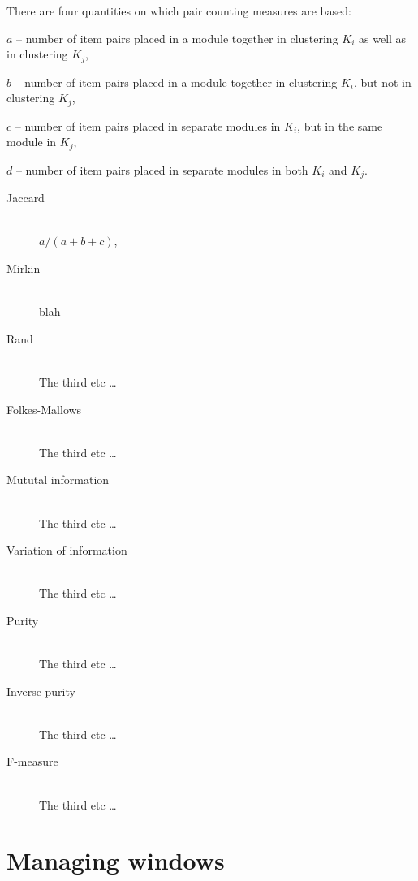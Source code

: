 There are four quantities on which pair counting measures are based:

  $a$ -- number of item pairs placed in a module together in clustering $K_{i}$ 
    as well as in clustering $K_{j}$,

  $b$ -- number of item pairs placed in a module together in clustering $K_{i}$,
    but not in clustering $K_{j}$,

  $c$ -- number of item pairs placed in separate modules in $K_{i}$, but in the 
    same module in $K_{j}$,

  $d$ -- number of item pairs placed in separate modules in both $K_{i}$ and 
    $K_{j}$.

%
\begin{description}
  \item[Jaccard] \hfill \\
  $a / (a + b+ c)$,

  \item[Mirkin] \hfill \\
  blah
  \item[Rand] \hfill \\
  The third etc \ldots
  \item[Folkes-Mallows] \hfill \\
  The third etc \ldots
  \item[Mututal information] \hfill \\
  The third etc \ldots
  \item[Variation of information] \hfill \\
  The third etc \ldots
  \item[Purity] \hfill \\
  The third etc \ldots
  \item[Inverse purity] \hfill \\
  The third etc \ldots
  \item[F-measure] \hfill \\
  The third etc \ldots
\end{description}
%



\section{Managing windows}



